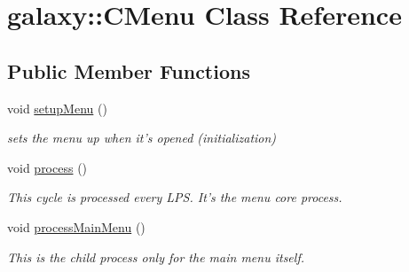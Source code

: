 \hypertarget{classgalaxy_1_1_c_menu}{
\section{galaxy::CMenu Class Reference}
\label{classgalaxy_1_1_c_menu}
}
\subsection*{Public Member Functions}
\begin{DoxyCompactItemize}
\item 
\hypertarget{classgalaxy_1_1_c_menu_a62f92666041430688b7a97092f652caf}{
void \hyperlink{classgalaxy_1_1_c_menu_a62f92666041430688b7a97092f652caf}{setupMenu} ()}
\label{classgalaxy_1_1_c_menu_a62f92666041430688b7a97092f652caf}

\begin{DoxyCompactList}\small\item\em sets the menu up when it's opened (initialization) \item\end{DoxyCompactList}\item 
\hypertarget{classgalaxy_1_1_c_menu_a678f9499c437fb02cbd2a49a88d583c2}{
void \hyperlink{classgalaxy_1_1_c_menu_a678f9499c437fb02cbd2a49a88d583c2}{process} ()}
\label{classgalaxy_1_1_c_menu_a678f9499c437fb02cbd2a49a88d583c2}

\begin{DoxyCompactList}\small\item\em This cycle is processed every LPS. It's the menu core process. \item\end{DoxyCompactList}\item 
\hypertarget{classgalaxy_1_1_c_menu_a819ae8a74eefb2b1c6a50b1bfd86fbba}{
void \hyperlink{classgalaxy_1_1_c_menu_a819ae8a74eefb2b1c6a50b1bfd86fbba}{processMainMenu} ()}
\label{classgalaxy_1_1_c_menu_a819ae8a74eefb2b1c6a50b1bfd86fbba}

\begin{DoxyCompactList}\small\item\em This is the child process only for the main menu itself. \item\end{DoxyCompactList}\end{DoxyCompactItemize}
